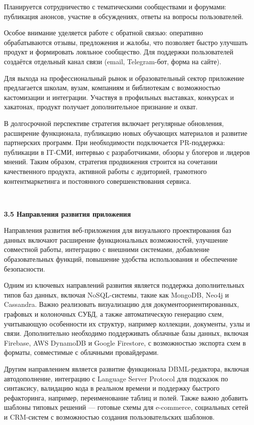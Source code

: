 Планируется сотрудничество с тематическими сообществами и
форумами: публикация анонсов, участие в обсуждениях, ответы на вопросы
пользователей.

Особое внимание уделяется работе с обратной связью: оперативно
обрабатываются отзывы, предложения и жалобы, что позволяет быстро
улучшать продукт и формировать лояльное сообщество. Для поддержки
пользователей создаётся отдельный канал связи (email, Telegram-бот, форма
на сайте).

Для выхода на профессиональный рынок и образовательный сектор
приложение предлагается школам, вузам, компаниям и библиотекам с
возможностью кастомизации и интеграции. Участвуя в профильных
выставках, конкурсах и хакатонах, продукт получает дополнительное
признание и охват.

В долгосрочной перспективе стратегия включает регулярные
обновления, расширение функционала, публикацию новых обучающих
материалов и развитие партнерских программ. При необходимости
подключается PR-поддержка: публикации в IT-СМИ, интервью с
разработчиками, обзоры у блогеров и лидеров мнений.
Таким образом, стратегия продвижения строится на сочетании
качественного продукта, активной работы с аудиторией, грамотного контентмаркетинга и постоянного совершенствования сервиса.

\

\textbf{\large 3.5 Направления развития приложения}

Направления развития веб-приложения для визуального проектирования баз данных включают расширение функциональных возможностей, улучшение совместной работы, интеграцию с внешними системами, добавление образовательных функций, повышение удобства использования и обеспечение безопасности.

Одним из ключевых направлений развития является поддержка дополнительных типов баз данных, включая NoSQL-системы, такие как MongoDB, Neo4j и Cassandra. Важно реализовать визуализацию для документоориентированных, графовых и колоночных СУБД, а также автоматическую генерацию схем, учитывающую особенности их структур, например коллекции, документы, узлы и связи. Дополнительно необходимо поддерживать облачные базы данных, включая Firebase, AWS DynamoDB и Google Firestore, с возможностью экспорта схем в форматы, совместимые с облачными провайдерами.

Другим направлением является развитие функционала DBML-редактора, включая автодополнение, интеграцию с Language Server Protocol для подсказок по синтаксису, валидацию кода в реальном времени и поддержку быстрого рефакторинга, например, переименование таблиц и полей. Также важно добавить шаблоны типовых решений — готовые схемы для e-commerce, социальных сетей и CRM-систем с возможностью создания пользовательских шаблонов.

